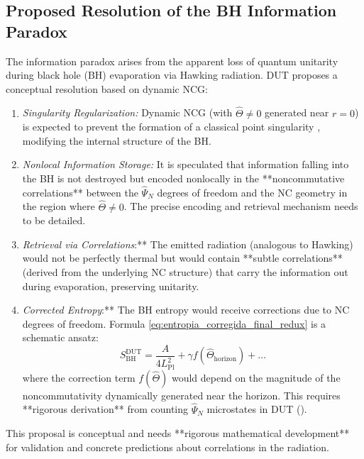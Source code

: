 \documentclass[11pt, a4paper]{article}
\theoremstyle{remark}
\newcommand{\Op}[1]{\hat{#1}}
\begin{document}
\subsection{Proposed Resolution of the BH Information Paradox}
\label{sec:paradoja_informacion_final}

The information paradox \citep{KieferQuantumGravityBook} arises from the apparent loss of quantum unitarity during black hole (BH) evaporation via Hawking radiation. DUT proposes a conceptual resolution based on dynamic NCG:
\begin{enumerate}
    \item \textit{Singularity Regularization:} Dynamic NCG (with \( \Op{\Theta} \neq 0 \) generated near \( r=0 \)) is expected to prevent the formation of a classical point singularity \citep[cf.][]{Nicolini:2008aj}, modifying the internal structure of the BH.
    \item \textit{Nonlocal Information Storage:} It is speculated that information falling into the BH is not destroyed but encoded nonlocally in the **noncommutative correlations** between the \( \Op{\Psi}_N \) degrees of freedom and the NC geometry in the region where \( \Op{\Theta} \neq 0 \). The precise encoding and retrieval mechanism needs to be detailed.
    \item \textit{Retrieval via Correlations}:** The emitted radiation (analogous to Hawking) would not be perfectly thermal but would contain **subtle correlations** (derived from the underlying NC structure) that carry the information out during evaporation, preserving unitarity.
    \item \textit{Corrected Entropy}:** The BH entropy would receive corrections due to NC degrees of freedom. Formula \eqref{eq:entropia_corregida_final_redux} is a schematic ansatz:
        \begin{equation} \label{eq:entropia_corregida_final_redux}
        S_{\text{BH}}^{\text{DUT}} = \frac{A}{4 L_{\text{Pl}}^2} + \gamma f(\Op{\Theta}_{\text{horizon}}) + \dots
        \end{equation}
        where the correction term \( f(\Op{\Theta}) \) would depend on the magnitude of the noncommutativity dynamically generated near the horizon. This requires **rigorous derivation** from counting \( \Op{\Psi}_N \) microstates in DUT ().
\end{enumerate}
This proposal is conceptual and needs **rigorous mathematical development** for validation and concrete predictions about correlations in the radiation.
\end{document}
